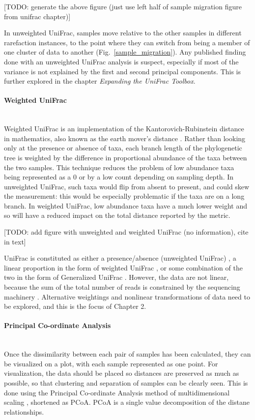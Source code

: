 [TODO: generate the above figure (just use left half of sample migration figure from unifrac chapter)]

In unweighted UniFrac, samples move relative to the other samples in different rarefaction instances, to the point where they can switch from being a member of one cluster of data to another (Fig.~\ref{sample_migration}). Any published finding done with an unweighted UniFrac analysis is suspect, especially if most of the variance is not explained by the first and second principal components. This is further explored in the chapter \textit{Expanding the UniFrac Toolbox}.

\FloatBarrier

\paragraph{Weighted UniFrac}\mbox{}\\
Weighted UniFrac is an implementation of the Kantorovich-Rubinstein distance in mathematics, also known as the earth mover's distance \cite{evans2012phylogenetic}. Rather than looking only at the presence or absence of taxa, each branch length of the phylogenetic tree is weighted by the difference in proportional abundance of the taxa between the two samples. This technique reduces the problem of low abundance taxa being represented as a 0 or by a low count depending on sampling depth. In unweighted UniFrac, such taxa would flip from absent to present, and could skew the measurement: this would be especially problematic if the taxa are on a long branch. In weighted UniFrac, low abundance taxa have a much lower weight and so will have a reduced impact on the total distance reported by the metric.

[TODO: add figure with unweighted and weighted UniFrac (no information), cite in text]

UniFrac is constituted as either a presence/absence (unweighted UniFrac) \cite{lozupone2005unifrac}, a linear proportion in the form of weighted UniFrac \cite{lozupone2007quantitative}, or some combination of the two in the form of Generalized UniFrac \cite{chen2012associating}. However, the data are not linear, because the sum of the total number of reads is constrained by the sequencing machinery \cite{friedman2012inferring}. Alternative weightings and nonlinear transformations of data need to be explored, and this is the focus of Chapter 2.

\paragraph{Principal Co-ordinate Analysis}\mbox{}\\
Once the dissimilarity between each pair of samples has been calculated, they can be visualized on a plot, with each sample represented as one point. For visualization, the data should be placed so distances are preserved as much as possible, so that clustering and separation of samples can be clearly seen. This is done using the Principal Co-ordinate Analysis method of multidimensional scaling \cite{dollhopf2001interpreting}, shortened as PCoA. PCoA is a single value decomposition of the distane relationships.

